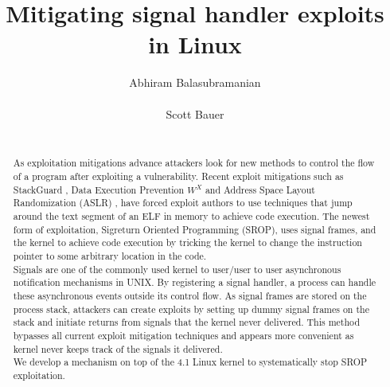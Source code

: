 \documentclass{sig-alternate-05-2015}
\begin{document}
\title{Mitigating signal handler exploits in Linux}
\author{
\alignauthor
Abhiram Balasubramanian\\
       \\
\alignauthor
Scott Bauer\\
       \\
}

\maketitle
\begin{abstract}
As exploitation mitigations advance attackers look for new methods to control the flow of a program after exploiting a vulnerability. Recent exploit mitigations such as StackGuard \cite{cowan1998stackguard}, Data Execution Prevention \(W^X\) \cite{WXORX} and Address Space Layout Randomization (ASLR) \cite{ASLR}, have forced exploit authors to use techniques that jump around the text segment of an ELF in memory to achieve code execution. The newest form of exploitation, Sigreturn Oriented Programming (SROP), uses signal frames, and the kernel to achieve code execution by tricking the kernel to change the instruction pointer to some arbitrary location in the code.\\
Signals are one of the commonly used kernel to user/user to user asynchronous notification mechanisms in UNIX. By registering a signal handler, a process can handle these asynchronous events outside its control flow. As signal frames are stored on the process stack, attackers can create exploits by setting up dummy signal frames on the stack and initiate returns from signals that the kernel never delivered. This method bypasses all current exploit mitigation techniques and  appears more convenient as kernel never keeps track of the signals it delivered.\\
We develop a mechanism on top of the 4.1 Linux kernel to systematically stop SROP exploitation.

\end{abstract}
\end{document}
